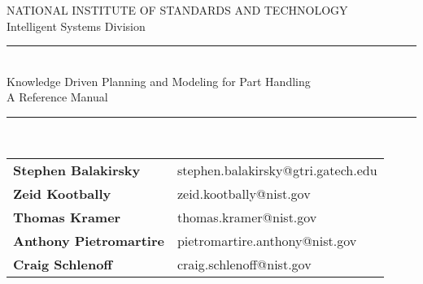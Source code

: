 \begin{titlepage}
\begin{center}

\LARGE{NATIONAL INSTITUTE OF STANDARDS AND TECHNOLOGY}\\
\vspace{1.5cm} %
\Large{Intelligent Systems Division}\\


\vspace{2cm} %
\textcolor{BrickRed}{\rule[1ex]{1\textwidth}{0.3mm}} \\%
\Huge{Knowledge Driven Planning and Modeling for Part Handling}\\
\vspace{1cm} %
\huge{A Reference Manual}\\
\textcolor{BrickRed}{\rule[1ex]{1\textwidth}{0.3mm}} \\%


\vspace{4.0cm} %

\begin{normalsize}
\begin{tabular}{l l}
\textbf{Stephen Balakirsky} & \textcolor{BrickRed}{stephen.balakirsky@gtri.gatech.edu}  \\
\textbf{Zeid Kootbally} & \textcolor{BrickRed}{zeid.kootbally@nist.gov}\\
\textbf{Thomas Kramer} & \textcolor{BrickRed}{thomas.kramer@nist.gov}\\
\textbf{Anthony Pietromartire} & \textcolor{BrickRed}{pietromartire.anthony@nist.gov}\\
\textbf{Craig Schlenoff} & \textcolor{BrickRed}{craig.schlenoff@nist.gov} 
\end{tabular}
\end{normalsize}
\vspace{1.0cm}
\date{\today}
\end{center}
\end{titlepage}
\cleardoublepage
